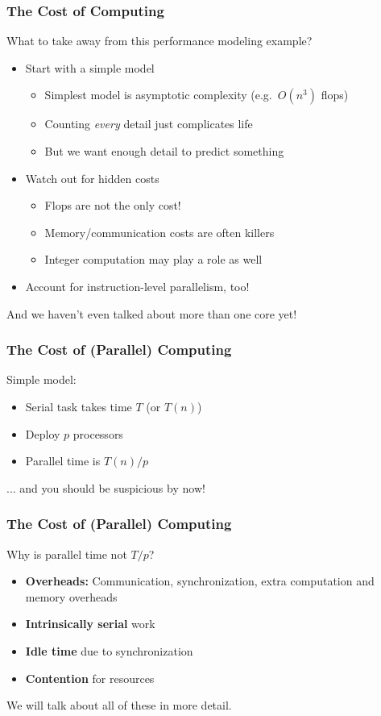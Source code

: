 \documentclass{beamer}
\begin{document}
\begin{frame}
  \frametitle{The Cost of Computing}

  What to take away from this performance modeling example?
  \begin{itemize}
  \item Start with a simple model
    \begin{itemize}
    \item Simplest model is asymptotic complexity (e.g.~$O(n^3)$ flops)
    \item Counting {\em every} detail just complicates life
    \item But we want enough detail to predict something
    \end{itemize}
  \item Watch out for hidden costs
    \begin{itemize}
    \item Flops are not the only cost!
    \item Memory/communication costs are often killers
    \item Integer computation may play a role as well
    \end{itemize}
  \item Account for instruction-level parallelism, too!
  \end{itemize}
  And we haven't even talked about more than one core yet!
\end{frame}


\begin{frame}
  \frametitle{The Cost of (Parallel) Computing}

  Simple model:
  \begin{itemize}
  \item Serial task takes time $T$ (or $T(n)$)
  \item Deploy $p$ processors
  \item Parallel time is $T(n)/p$
  \end{itemize}
  ... and you should be suspicious by now!
  
\end{frame}


\begin{frame}
  \frametitle{The Cost of (Parallel) Computing}

  Why is parallel time not $T/p$?
  \begin{itemize}
  \item {\bf Overheads:} Communication, synchronization, extra
    computation and memory overheads
  \item {\bf Intrinsically serial} work
  \item {\bf Idle time} due to synchronization
  \item {\bf Contention} for resources
  \end{itemize}
  We will talk about all of these in more detail.
  
\end{frame}
\end{document}
